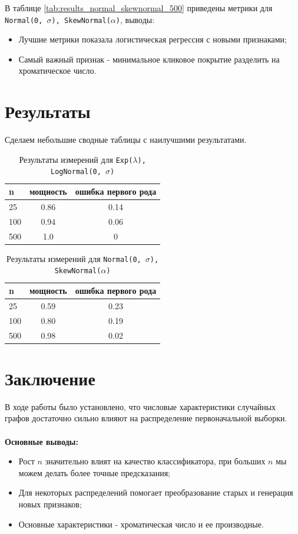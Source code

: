 \documentclass[12pt,a4paper]{report}
\begin{document}
В таблице \ref{tab:results_normal_skewnormal_500} приведены метрики для \texttt{Normal(0, $\sigma$), SkewNormal($\alpha$)}, выводы:
\begin{itemize}
    \item Лучшие метрики показала логистическая регрессия с новыми признаками;
    \item Самый важный признак - минимальное кликовое покрытие разделить на хроматическое число.
\end{itemize}

\chapter{Результаты}
Сделаем небольшие сводные таблицы с наилучшими результатами.
\begin{table}[htbp]
  \centering
  \caption{Результаты измерений для \texttt{Exp($\lambda$), LogNormal(0, $\sigma$)}}
  \label{tab:results_exp_lognormal}
  \begin{tabular}{@{} l c c @{}}
    \toprule
    n & мощность & ошибка первого рода \\
    \midrule
    25 & 0.86 & 0.14 \\
    100 & 0.94 & 0.06 \\
    500 & 1.0 & 0 \\
    \bottomrule
  \end{tabular}
\end{table}

\begin{table}[htbp]
  \centering
  \caption{Результаты измерений для \texttt{Normal(0, $\sigma$), SkewNormal($\alpha$)}}
  \label{tab:results_normal_skewnormal}
  \begin{tabular}{@{} l c c @{}}
    \toprule
    n & мощность & ошибка первого рода \\
    \midrule
    25 & 0.59 & 0.23 \\
    100 & 0.80 & 0.19 \\
    500 & 0.98 & 0.02 \\
    \bottomrule
  \end{tabular}
\end{table}

\chapter{Заключение}
В ходе работы было установлено, что числовые характеристики случайных графов достаточно сильно влияют на распределение первоначальной выборки.\\\\
\textbf{Основные выводы:}
\begin{itemize}
  \item Рост $n$ значительно влият на качество классификатора, при больших $n$ мы можем делать более точные предсказания;
  \item Для некоторых распределений помогает преобразование старых и генерация новых признаков;
  \item Основные характеристики - хроматическая число и ее производные.
\end{itemize}
\end{document}
